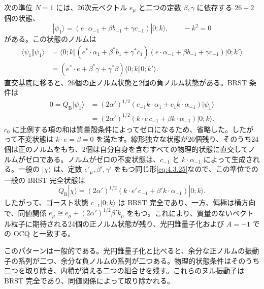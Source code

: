 次の準位 $N=1$ には、26次元ベクトル $e_\mu$ と二つの定数 $\beta,\gamma$ に依存する $26+2$ 個の状態、
\begin{equation}
|\psi_1\rangle=(e\cdot\alpha_{-1}+\beta b_{-1}+\gamma c_{-1})|0;k\rangle,
\qquad -k^2=0
\tag{4.3.25}\label{eq:4.3.25}
\end{equation}
がある。この状態のノルムは
\begin{equation}
\begin{aligned}
\langle\psi_1\Vert\psi_1\rangle
&=\langle0;k\Vert
(e^*\cdot\alpha_1+\beta^*b_1+\gamma^*c_1)
(e\cdot\alpha_{-1}+\beta b_{-1}+\gamma c_{-1})|0;k'\rangle\\
&=(e^*\cdot e+\beta^*\gamma+\gamma^*\beta)
\langle0;k\Vert0;k'\rangle .
\end{aligned}
\tag{4.3.26}\label{eq:4.3.26}
\end{equation}
直交基底に移ると、26個の正ノルム状態と2個の負ノルム状態がある。BRST 条件は
\begin{equation}
\begin{aligned}
0=Q_{\mathrm B}|\psi_1\rangle
&=(2\alpha')^{1/2}(c_{-1}k\cdot\alpha_1+c_1k\cdot\alpha_{-1})|\psi_1\rangle\\
&=(2\alpha')^{1/2}(k\cdot e\,c_{-1}+\beta k\cdot\alpha_{-1})|0;k\rangle .
\end{aligned}
\tag{4.3.27}\label{eq:4.3.27}
\end{equation}
$c_0$ に比例する項の和は質量殻条件によってゼロになるため、省略した。したがって不変状態は $k\cdot e=\beta=0$ を満たす。線形独立な状態が26個残り、そのうち24個は正のノルムをもち、2個は自分自身を含むすべての物理的状態に直交してノルムがゼロである。ノルムがゼロの不変状態は、$c_{-1}$ と $k\cdot\alpha_{-1}$ によって生成される。一般の $|\chi\rangle$ は、定数 $e'_\mu,\beta',\gamma'$ をもつ同じ形\eqref{eq:4.3.25}なので、この準位での一般の BRST 完全状態は
\begin{equation}
Q_{\mathrm B}|\chi\rangle=(2\alpha')^{1/2}
(k\cdot e'\,c_{-1}+\beta'k\cdot\alpha_{-1})|0;k\rangle .
\tag{4.3.28}\label{eq:4.3.28}
\end{equation}
したがって、ゴースト状態 $c_{-1}|0;k\rangle$ は BRST 完全であり、一方、偏極は横方向で、同値関係
$e_\mu\cong e_\mu+(2\alpha')^{1/2}\beta'k_\mu$
をもつ。これにより、質量のないベクトル粒子に期待される24個の正ノルム状態が残り、光円錐量子化および $A=-1$ での OCQ と一致する。

このパターンは一般的である。光円錐量子化と比べると、余分な正ノルムの振動子の系列が二つ、余分な負ノルムの系列が二つある。物理的状態条件はそのうち二つを取り除き、内積が消える二つの組合せを残す。これらのヌル振動子は BRST 完全であり、同値関係によって取り除かれる。

